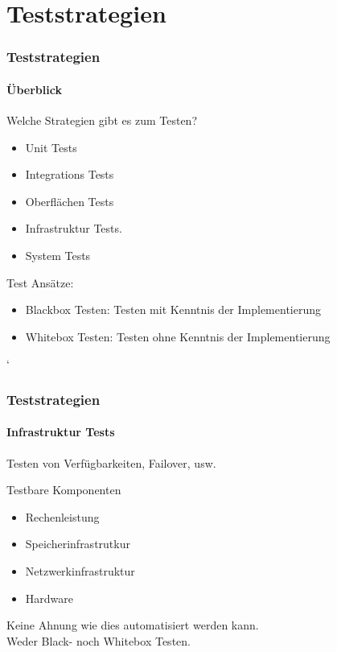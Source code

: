 \section{Teststrategien}
\begin{frame}
  \frametitle{Teststrategien}
  \framesubtitle{Überblick}
  \begin{block}{Welche Strategien gibt es zum Testen?}
    \pause
    \begin{itemize}
      \item Unit Tests
        \pause
      \item Integrations Tests
        \pause
      \item Oberflächen Tests
        \pause
      \item Infrastruktur Tests.
        \pause
      \item System Tests
        \pause
    \end{itemize}
  \end{block}
  \pause
  \begin{block}{Test Ansätze:}
    \begin{itemize}
      \item Blackbox Testen: Testen mit Kenntnis der Implementierung
        \pause
      \item Whitebox Testen: Testen ohne Kenntnis der Implementierung
    \end{itemize}
  \end{block}`
\end{frame}

\begin{frame}
  \frametitle{Teststrategien}
  \framesubtitle{Infrastruktur Tests}
  Testen von Verfügbarkeiten, Failover, usw.
  \begin{block}{Testbare Komponenten}
    \pause
    \begin{itemize}
      \item Rechenleistung
        \pause
      \item Speicherinfrastrutkur
        \pause
      \item Netzwerkinfrastruktur
        \pause
      \item Hardware
    \end{itemize}
  \end{block}
  \pause
  Keine Ahnung wie dies automatisiert werden kann.\\

  Weder Black- noch Whitebox Testen.
\end{frame}

